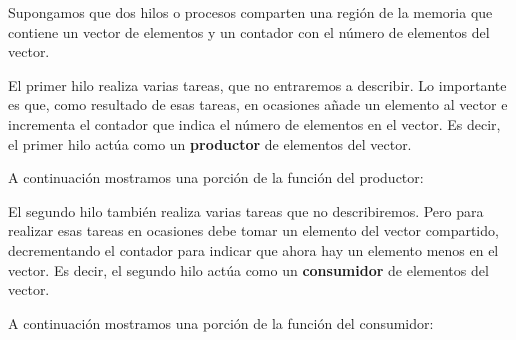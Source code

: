 Supongamos que dos hilos o procesos comparten una región de la memoria
que contiene un vector de elementos y un contador con el número de
elementos del vector.

El primer hilo realiza varias tareas, que no entraremos a describir. Lo
importante es que, como resultado de esas tareas, en ocasiones añade un
elemento al vector e incrementa el contador que indica el número de
elementos en el vector. Es decir, el primer hilo actúa como un
\textbf{{}productor} de elementos del vector.

A continuación mostramos una porción de la función del productor:

\begin{Shaded}
\begin{Highlighting}[]
\OperatorTok{(}\OperatorTok{)}
\OperatorTok{\{}
\OperatorTok{=}\OperatorTok{();}

     \OperatorTok{(}\OperatorTok{==}\OperatorTok{);}

\OperatorTok{[}\OperatorTok{]} \OperatorTok{=}\OperatorTok{;}
    \OperatorTok{++}\OperatorTok{;}
\OperatorTok{\}}
\end{Highlighting}
\end{Shaded}

El segundo hilo también realiza varias tareas que no describiremos. Pero
para realizar esas tareas en ocasiones debe tomar un elemento del vector
compartido, decrementando el contador para indicar que ahora hay un
elemento menos en el vector. Es decir, el segundo hilo actúa como un
\textbf{{}consumidor} de elementos del vector.

A continuación mostramos una porción de la función del consumidor:

\begin{Shaded}
\begin{Highlighting}[]
\OperatorTok{(}\OperatorTok{)}
\OperatorTok{\{}
     \OperatorTok{(}\OperatorTok{==} \OperatorTok{);}

    \OperatorTok{{-}{-}}\OperatorTok{;}
\OperatorTok{=}\OperatorTok{[}\OperatorTok{];}

\OperatorTok{(}\OperatorTok{);}
\OperatorTok{\}}
\end{Highlighting}
\end{Shaded}

